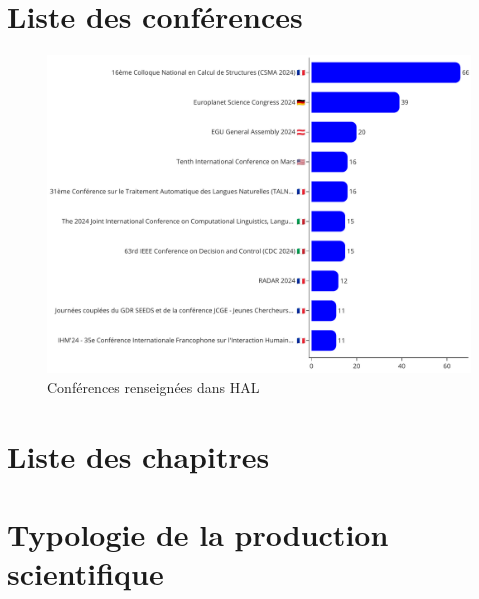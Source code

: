\documentclass[french, 11pt]{dibiso/biso}
\begin{document}






\pagebreak

\section{Liste des conférences}

\begin{figure}[!h]
  \includegraphics[width=\textwidth]{figures/conferences.pdf}
  \centering
  \caption{Conférences renseignées dans HAL}
  \label{fig_conferences}
\end{figure}


\pagebreak

\section{Liste des chapitres}

{
  \footnotesize
  
}

\pagebreak

\section{Typologie de la production scientifique}
\end{document}
